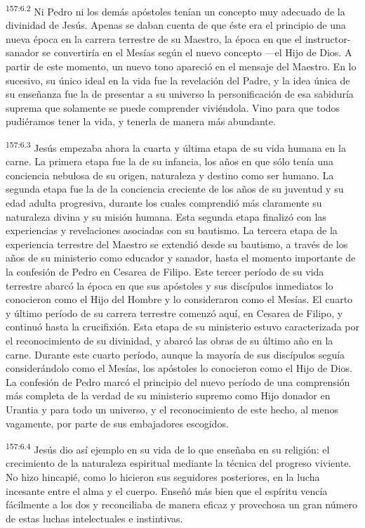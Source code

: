 \par 
\textsuperscript{157:6.2} Ni Pedro ni los demás apóstoles tenían un concepto muy adecuado de la divinidad de Jesús. Apenas se daban cuenta de que éste era el principio de una nueva época en la carrera terrestre de su Maestro, la época en que el instructor-sanador se convertiría en el Mesías según el nuevo concepto ---el Hijo de Dios. A partir de este momento, un nuevo tono apareció en el mensaje del Maestro. En lo sucesivo, su único ideal en la vida fue la revelación del Padre, y la idea única de su enseñanza fue la de presentar a su universo la personificación de esa sabiduría suprema que solamente se puede comprender viviéndola. Vino para que todos pudiéramos tener la vida, y tenerla de manera más abundante.

\par 
\textsuperscript{157:6.3} Jesús empezaba ahora la cuarta y última etapa de su vida humana en la carne. La primera etapa fue la de su infancia, los años en que sólo tenía una conciencia nebulosa de su origen, naturaleza y destino como ser humano. La segunda etapa fue la de la conciencia creciente de los años de su juventud y su edad adulta progresiva, durante los cuales comprendió más claramente su naturaleza divina y su misión humana. Esta segunda etapa finalizó con las experiencias y revelaciones asociadas con su bautismo. La tercera etapa de la experiencia terrestre del Maestro se extendió desde su bautismo, a través de los años de su ministerio como educador y sanador, hasta el momento importante de la confesión de Pedro en Cesarea de Filipo. Este tercer período de su vida terrestre abarcó la época en que sus apóstoles y sus discípulos inmediatos lo conocieron como el Hijo del Hombre y lo consideraron como el Mesías. El cuarto y último período de su carrera terrestre comenzó aquí, en Cesarea de Filipo, y continuó hasta la crucifixión. Esta etapa de su ministerio estuvo caracterizada por el reconocimiento de su divinidad, y abarcó las obras de su último año en la carne. Durante este cuarto período, aunque la mayoría de sus discípulos seguía considerándolo como el Mesías, los apóstoles lo conocieron como el Hijo de Dios. La confesión de Pedro marcó el principio del nuevo período de una comprensión más completa de la verdad de su ministerio supremo como Hijo donador en Urantia y para todo un universo, y el reconocimiento de este hecho, al menos vagamente, por parte de sus embajadores escogidos.

\par 
\textsuperscript{157:6.4} Jesús dio así ejemplo en su vida de lo que enseñaba en su religión: el crecimiento de la naturaleza espiritual mediante la técnica del progreso viviente. No hizo hincapié, como lo hicieron sus seguidores posteriores, en la lucha incesante entre el alma y el cuerpo. Enseñó más bien que el espíritu vencía fácilmente a los dos y reconciliaba de manera eficaz y provechosa un gran número de estas luchas intelectuales e instintivas.

